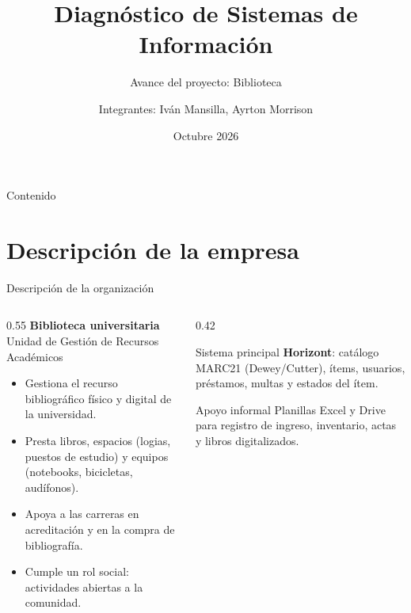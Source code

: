 \documentclass[aspectratio=169,10pt]{beamer}
\title{Diagnóstico de Sistemas de Información}
\subtitle{Avance del proyecto: Biblioteca}
\author{\small Integrantes: Iván Mansilla, Ayrton Morrison}
\institute{Diseño de Sistemas de Información}
\date{Octubre 2026}
\begin{document}
\begin{frame}
  \titlepage
\end{frame}

\begin{frame}{Contenido}
  \tableofcontents
\end{frame}

\section{Descripción de la empresa}
\begin{frame}{Descripción de la organización}
  \begin{columns}[T]
    \begin{column}{0.55\textwidth}
      \textbf{Biblioteca universitaria}\\
      \small Unidad de Gestión de Recursos Académicos

      \vspace{0.6em}
      \begin{itemize}\small
        \item Gestiona el recurso bibliográfico físico y digital de la universidad.
        \item Presta libros, espacios (logias, puestos de estudio) y equipos
              (notebooks, bicicletas, audífonos).
        \item Apoya a las carreras en acreditación y en la compra de bibliografía.
        \item Cumple un rol social: actividades abiertas a la comunidad.
      \end{itemize}
    \end{column}
    \begin{column}{0.42\textwidth}
      \begin{block}{Sistema principal}
        \small
        \textbf{Horizont}: catálogo MARC21 (Dewey/Cutter), ítems, usuarios,
        préstamos, multas y estados del ítem.
      \end{block}
      \vspace{0.3em}
      \begin{block}{Apoyo informal}
        \small Planillas Excel y Drive para registro de ingreso, inventario,
        actas y libros digitalizados.
      \end{block}
    \end{column}
  \end{columns}
\end{frame}
\end{document}
